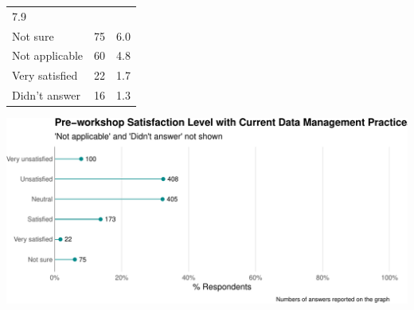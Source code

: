 \documentclass[]{article}
\begin{document}
\begin{longtable}[]{@{}lrr@{}}
\begin{minipage}[t]{0.06\columnwidth}
7.9\strut
\end{minipage}\tabularnewline
\begin{minipage}[t]{0.80\columnwidth}\raggedright\strut
Not sure\strut
\end{minipage} & \begin{minipage}[t]{0.05\columnwidth}\raggedleft\strut
75\strut
\end{minipage} & \begin{minipage}[t]{0.06\columnwidth}\raggedleft\strut
6.0\strut
\end{minipage}\tabularnewline
\begin{minipage}[t]{0.80\columnwidth}\raggedright\strut
Not applicable\strut
\end{minipage} & \begin{minipage}[t]{0.05\columnwidth}\raggedleft\strut
60\strut
\end{minipage} & \begin{minipage}[t]{0.06\columnwidth}\raggedleft\strut
4.8\strut
\end{minipage}\tabularnewline
\begin{minipage}[t]{0.80\columnwidth}\raggedright\strut
Very satisfied\strut
\end{minipage} & \begin{minipage}[t]{0.05\columnwidth}\raggedleft\strut
22\strut
\end{minipage} & \begin{minipage}[t]{0.06\columnwidth}\raggedleft\strut
1.7\strut
\end{minipage}\tabularnewline
\begin{minipage}[t]{0.80\columnwidth}\raggedright\strut
Didn't answer\strut
\end{minipage} & \begin{minipage}[t]{0.05\columnwidth}\raggedleft\strut
16\strut
\end{minipage} & \begin{minipage}[t]{0.06\columnwidth}\raggedleft\strut
1.3\strut
\end{minipage}\tabularnewline
\bottomrule
\end{longtable}

\includegraphics[width=720]{figures/dc-satisfaction-level-plot-1}
\end{document}
